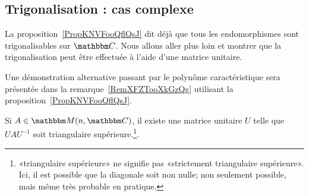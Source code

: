 \subsection{Trigonalisation : cas complexe}

La proposition~\ref{PropKNVFooQflQsJ} dit déjà que tous les endomorphismes sont trigonalisables sur \( \eC\). Nous allons aller plus loin et montrer que la trigonalisation peut être effectuée à l'aide d'une matrice unitaire.

Une démonstration alternative passant par le polynôme caractéristique sera présentée dans la remarque~\ref{RemXFZTooXkGzQg} utilisant la proposition~\ref{PropKNVFooQflQsJ}.
\begin{lemma}  \label{LemSchurComplHAftTq}
    Si \( A\in\eM(n,\eC)\), il existe une matrice unitaire \( U\) telle que \( UAU^{-1}\) soit triangulaire supérieure.\footnote{«triangulaire supérieure» ne signifie pas «strictement triangulaire supérieure». Ici, il est possible que la diagonale soit non nulle; non seulement possible, mais même très probable en pratique.}.
\end{lemma}

